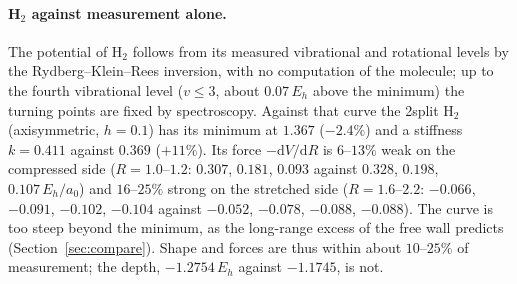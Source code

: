 \documentclass[11pt]{article}
\begin{document}
\paragraph{H$_2$ against measurement alone.} The potential of H$_2$ follows from its measured vibrational and
rotational levels by the Rydberg--Klein--Rees inversion, with no computation of the molecule; up to the
fourth vibrational level ($v \le 3$, about $0.07\,E_h$ above the minimum) the turning points are fixed by
spectroscopy. Against that curve the 2split H$_2$ (axisymmetric, $h = 0.1$) has its minimum at $1.367$
($-2.4\%$) and a stiffness $k = 0.411$ against $0.369$ ($+11\%$). Its force $-\mathrm{d}V/\mathrm{d}R$ is
$6$--$13\%$ weak on the compressed side ($R = 1.0$--$1.2$: $0.307$, $0.181$, $0.093$ against $0.328$, $0.198$,
$0.107\,E_h/a_0$) and $16$--$25\%$ strong on the stretched side ($R = 1.6$--$2.2$: $-0.066$, $-0.091$,
$-0.102$, $-0.104$ against $-0.052$, $-0.078$, $-0.088$, $-0.088$). The curve is too steep beyond the minimum,
as the long-range excess of the free wall predicts (Section~\ref{sec:compare}). Shape and forces are thus
within about $10$--$25\%$ of measurement; the depth, $-1.2754\,E_h$ against $-1.1745$, is not.
\end{document}
